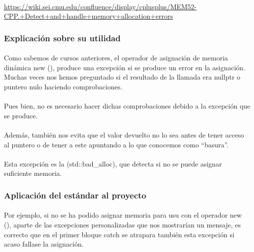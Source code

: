 			\paragraph{}\url{https://wiki.sei.cmu.edu/confluence/display/cplusplus/MEM52-CPP.+Detect+and+handle+memory+allocation+errors}
		
		\subsubsection{Explicación sobre su utilidad}
		
			\paragraph{}Como sabemos de cursos anteriores, el operador de asignación de memoria dinámica new (), produce una excepción si se produce un error en la asignación. Muchas veces nos hemos preguntado si el resultado de la llamada era nullptr o puntero nulo haciendo comprobaciones.
			
			\paragraph{}Pues bien, no es necesario hacer dichas comprobaciones debido a la excepción que se produce.
			
			\paragraph{}Además, también nos evita que el valor devuelto no lo sea antes de tener acceso al puntero o de tener a este apuntando a lo que conocemos como “basura”.
			
			\paragraph{}Esta excepción es la (std::bad\_alloc), que detecta si no se puede asignar suficiente memoria.
		
		\subsubsection{Aplicación del estándar al proyecto}

			\paragraph{}Por ejemplo, si no se ha podido asignar memoria para usu con el operador new (), aparte de las excepciones personalizadas que nos mostrarían un mensaje, es correcto que en el primer bloque catch se atrapara también esta excepción si acaso fallase la asignación.
			
